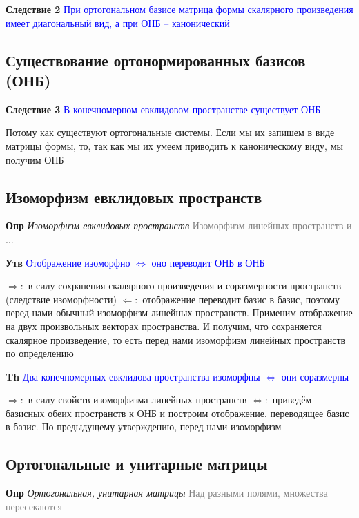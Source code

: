 \documentclass[a4paper, 14pt]{article}
\begin{document}
    \textbf{Следствие 2} \textcolor{blue}{При ортогональном базисе матрица формы скалярного произведения имеет
    диагональный вид, а при ОНБ -- канонический}
    
    \subsection{Существование ортонормированных базисов (ОНБ)}
    
    \textbf{Следствие 3} \textcolor{blue}{В конечномерном евклидовом пространстве существует ОНБ}
    
    Потому как существуют ортогональные системы.
    Если мы их запишем в виде матрицы формы, то, так как мы их умеем приводить к каноническому виду, мы получим ОНБ
    
    \subsection{Изоморфизм евклидовых пространств}
    
    \textbf{Опр} \textit{Изоморфизм евклидовых пространств} \textcolor{gray}{Изоморфизм линейных пространств и ...}
    
    \textbf{Утв} \textcolor{blue}{Отображение изоморфно $\Leftrightarrow$ оно переводит ОНБ в ОНБ}
    
    $\Rightarrow:$ в силу сохранения скалярного произведения и соразмерности пространств (следствие изоморфности)
    $\Leftarrow:$ отображение переводит базис в базис, поэтому перед нами обычный изоморфизм линейных
    пространств.
    Применим отображение на двух произвольных векторах пространства.
    И получим, что сохраняется скалярное произведение, то есть перед нами изоморфизм линейных пространств по определению
    
    \textbf{Th} \textcolor{blue}{Два конечномерных евклидова пространства изоморфны $\Leftrightarrow$ они соразмерны}
    
    $\Rightarrow:$ в силу свойств изоморфизма линейных пространств
    $\Leftrightarrow:$ приведём базисных обеих пространств к ОНБ и построим отображение, переводящее базис в базис.
    По предыдущему утверждению, перед нами изоморфизм
    
    \subsection{Ортогональные и унитарные матрицы}
    
    \textbf{Опр} \textit{Ортогональная, унитарная матрицы} \textcolor{gray}{Над разными полями, множества пересекаются}
    
\end{document}
